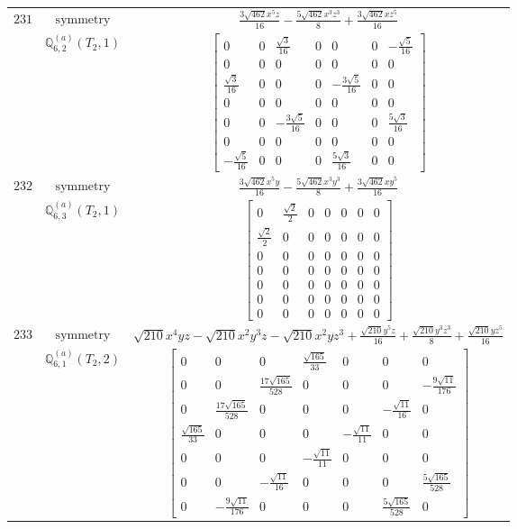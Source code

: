\documentclass[fleqn,8pt,landscape]{jsarticle}
\begin{document}
\begin{longtable}{ccc}
$ 231 $ & $ \text{symmetry} $ & $ \frac{3 \sqrt{462} x^{5} z}{16} - \frac{5 \sqrt{462} x^{3} z^{3}}{8} + \frac{3 \sqrt{462} x z^{5}}{16} $ \\
$  $ & $ \mathbb{Q}_{6,2}^{(a)}(T_{2},1) $ & $ \begin{bmatrix} 0 & 0 & \frac{\sqrt{3}}{16} & 0 & 0 & 0 & - \frac{\sqrt{5}}{16} \\ 0 & 0 & 0 & 0 & 0 & 0 & 0 \\ \frac{\sqrt{3}}{16} & 0 & 0 & 0 & - \frac{3 \sqrt{5}}{16} & 0 & 0 \\ 0 & 0 & 0 & 0 & 0 & 0 & 0 \\ 0 & 0 & - \frac{3 \sqrt{5}}{16} & 0 & 0 & 0 & \frac{5 \sqrt{3}}{16} \\ 0 & 0 & 0 & 0 & 0 & 0 & 0 \\ - \frac{\sqrt{5}}{16} & 0 & 0 & 0 & \frac{5 \sqrt{3}}{16} & 0 & 0 \end{bmatrix} $ \\ \hline
$ 232 $ & $ \text{symmetry} $ & $ \frac{3 \sqrt{462} x^{5} y}{16} - \frac{5 \sqrt{462} x^{3} y^{3}}{8} + \frac{3 \sqrt{462} x y^{5}}{16} $ \\
$  $ & $ \mathbb{Q}_{6,3}^{(a)}(T_{2},1) $ & $ \begin{bmatrix} 0 & \frac{\sqrt{2}}{2} & 0 & 0 & 0 & 0 & 0 \\ \frac{\sqrt{2}}{2} & 0 & 0 & 0 & 0 & 0 & 0 \\ 0 & 0 & 0 & 0 & 0 & 0 & 0 \\ 0 & 0 & 0 & 0 & 0 & 0 & 0 \\ 0 & 0 & 0 & 0 & 0 & 0 & 0 \\ 0 & 0 & 0 & 0 & 0 & 0 & 0 \\ 0 & 0 & 0 & 0 & 0 & 0 & 0 \end{bmatrix} $ \\ \hline
$ 233 $ & $ \text{symmetry} $ & $ \sqrt{210} x^{4} y z - \sqrt{210} x^{2} y^{3} z - \sqrt{210} x^{2} y z^{3} + \frac{\sqrt{210} y^{5} z}{16} + \frac{\sqrt{210} y^{3} z^{3}}{8} + \frac{\sqrt{210} y z^{5}}{16} $ \\
$  $ & $ \mathbb{Q}_{6,1}^{(a)}(T_{2},2) $ & $ \begin{bmatrix} 0 & 0 & 0 & \frac{\sqrt{165}}{33} & 0 & 0 & 0 \\ 0 & 0 & \frac{17 \sqrt{165}}{528} & 0 & 0 & 0 & - \frac{9 \sqrt{11}}{176} \\ 0 & \frac{17 \sqrt{165}}{528} & 0 & 0 & 0 & - \frac{\sqrt{11}}{16} & 0 \\ \frac{\sqrt{165}}{33} & 0 & 0 & 0 & - \frac{\sqrt{11}}{11} & 0 & 0 \\ 0 & 0 & 0 & - \frac{\sqrt{11}}{11} & 0 & 0 & 0 \\ 0 & 0 & - \frac{\sqrt{11}}{16} & 0 & 0 & 0 & \frac{5 \sqrt{165}}{528} \\ 0 & - \frac{9 \sqrt{11}}{176} & 0 & 0 & 0 & \frac{5 \sqrt{165}}{528} & 0 \end{bmatrix} $ \\ \hline

\end{longtable}
\end{document}
